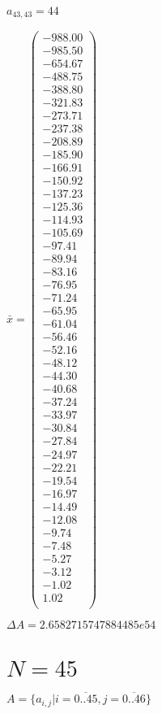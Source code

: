 \documentclass[a4paper,12pt]{article}
\begin{document}
$a _{ 43, 43 } = 44$

$\bar { x } = \begin{pmatrix}
-988.00 \\
-985.50 \\
-654.67 \\
-488.75 \\
-388.80 \\
-321.83 \\
-273.71 \\
-237.38 \\
-208.89 \\
-185.90 \\
-166.91 \\
-150.92 \\
-137.23 \\
-125.36 \\
-114.93 \\
-105.69 \\
-97.41 \\
-89.94 \\
-83.16 \\
-76.95 \\
-71.24 \\
-65.95 \\
-61.04 \\
-56.46 \\
-52.16 \\
-48.12 \\
-44.30 \\
-40.68 \\
-37.24 \\
-33.97 \\
-30.84 \\
-27.84 \\
-24.97 \\
-22.21 \\
-19.54 \\
-16.97 \\
-14.49 \\
-12.08 \\
-9.74 \\
-7.48 \\
-5.27 \\
-3.12 \\
-1.02 \\
1.02 \\
\end{pmatrix}
$

$\Delta A = 2.6582715747884485e54$



\section{ $N = 45$ }
$A = \{ a _{ i, j } | i = \overline { 0..45 }, j = \overline { 0..46 } \}$
\end{document}
